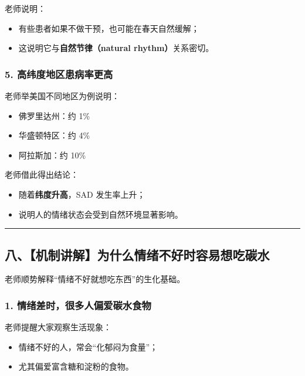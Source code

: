 \documentclass[
  chinese,
  9pt,
  a4paper,
]{ctexart}
\providecommand{\tightlist}{%
  \setlength{\itemsep}{0pt}\setlength{\parskip}{0pt}}
\begin{document}
老师说明：

\begin{itemize}
\tightlist
\item
  有些患者如果不做干预，也可能在春天自然缓解；
\item
  这说明它与\textbf{自然节律（natural rhythm）}关系密切。
\end{itemize}

\subsubsection{5.
高纬度地区患病率更高}\label{ux9ad8ux7eacux5ea6ux5730ux533aux60a3ux75c5ux7387ux66f4ux9ad8}

老师举美国不同地区为例说明：

\begin{itemize}
\tightlist
\item
  佛罗里达州：约 1\%
\item
  华盛顿特区：约 4\%
\item
  阿拉斯加：约 10\%
\end{itemize}

老师借此得出结论：

\begin{itemize}
\tightlist
\item
  随着\textbf{纬度升高}，SAD 发生率上升；
\item
  说明人的情绪状态会受到自然环境显著影响。
\end{itemize}

\begin{center}\rule{0.5\linewidth}{0.5pt}\end{center}

\subsection{八、【机制讲解】为什么情绪不好时容易想吃碳水}\label{ux516bux673aux5236ux8bb2ux89e3ux4e3aux4ec0ux4e48ux60c5ux7eeaux4e0dux597dux65f6ux5bb9ux6613ux60f3ux5403ux78b3ux6c34}

老师顺势解释``情绪不好就想吃东西''的生化基础。

\subsubsection{1.
情绪差时，很多人偏爱碳水食物}\label{ux60c5ux7eeaux5deeux65f6ux5f88ux591aux4ebaux504fux7231ux78b3ux6c34ux98dfux7269}

老师提醒大家观察生活现象：

\begin{itemize}
\tightlist
\item
  情绪不好的人，常会``化郁闷为食量''；
\item
  尤其偏爱富含糖和淀粉的食物。
\end{itemize}
\end{document}
